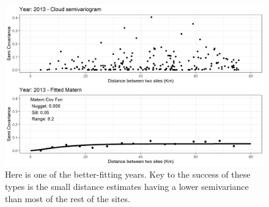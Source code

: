 \begin{figure}[ht]
\centering
\includegraphics[width = 12cm]{Figures/EmpiricalVariograms/Empirical_Variogram_2013.png}
\caption{Here is one of the better-fitting years.  Key to the success of these types is the small distance estimates having a lower semivariance than most of the rest of the sites.}
\label{fig:Variogram2013}
\end{figure}
